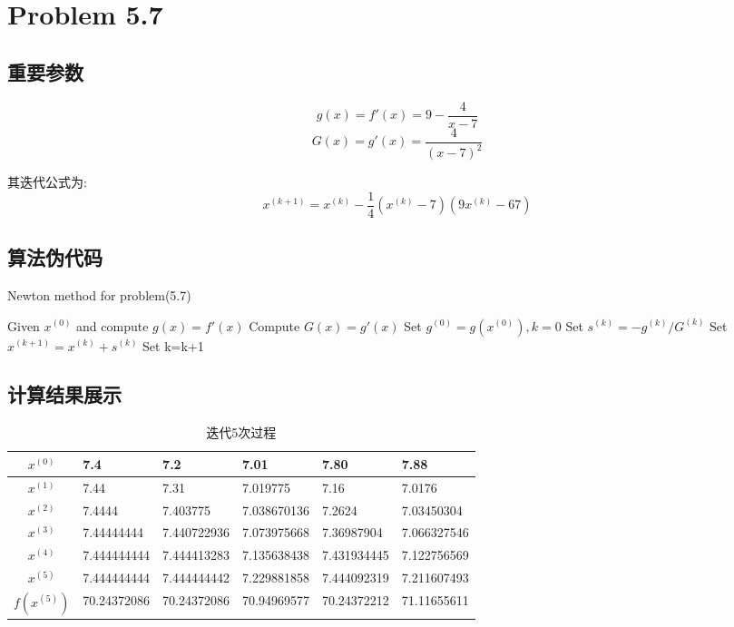 \newpage
\section{Problem 5.7}
\subsection{重要参数}

\[g(x)=f'(x)=9-\dfrac{4}{x-7}\]
\[G(x)=g'(x)=\dfrac{4}{(x-7)^2}\]

其迭代公式为:
\[x^{(k+1)}=x^{(k)}-\dfrac{1}{4}(x^{(k)}-7)(9x^{(k)}-67)\]


\subsection{算法伪代码}
\begin{algorithm}[h]  
\caption{Newton method for problem(5.7)}  
\begin{algorithmic}[1]  
\STATE Given $x^{(0)}$ and compute $g(x)=f'(x)$
\STATE Compute $G(x)=g'(x)$
\STATE Set $g^{(0)}=g(x^{(0)}),k=0$
\STATE Set $s^{(k)}=-g^{(k)}/G^{(k)}$
\STATE Set $x^{(k+1)}=x^{(k)}+s^{(k)}$
\STATE Set k=k+1
\ENDWHILE
\end{algorithmic}  
\end{algorithm}  



\subsection{计算结果展示}
\begin{table}[htbp]
  \centering
  \caption{迭代5次过程}
    \begin{tabular}{clllll}
\toprule
  $x^{(0)}$&7.4  & 7.2  & 7.01 &7.80  & 7.88 \\
	\midrule
   $x^{(1)}$& 7.44  & 7.31  & 7.019775 & 7.16  & 7.0176 \\
    $x^{(2)}$&7.4444 & 7.403775 & 7.038670136 & 7.2624 & 7.03450304 \\
    $x^{(3)}$&7.44444444 & 7.440722936 & 7.073975668 & 7.36987904 & 7.066327546 \\
   $ x^{(4)}$&7.444444444 & 7.444413283 & 7.135638438 & 7.431934445 & 7.122756569 \\
    $x^{(5)}$&7.444444444 & 7.444444442 & 7.229881858 & 7.444092319 & 7.211607493 \\
	\midrule
    $f(x^{(5)})$&70.24372086 & 70.24372086 & 70.94969577 & 70.24372212 & 71.11655611 \\
	\bottomrule
    \end{tabular}%
  \label{tab:addlabel}%
\end{table}%

